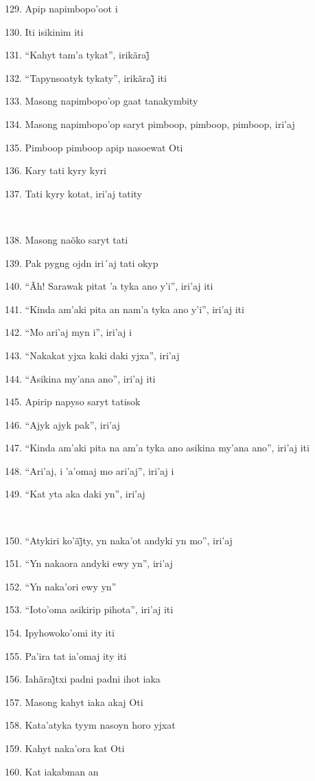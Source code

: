 129. Apip napimbopo'oot i

130. Iti isikinim iti

131. ``Kahyt tam’a tykat'', irikãraj̃

132. ``Tapynsoatyk tykaty'', irikãraj̃ iti

133. Masong napimbopo'op gaat tanakymbity

134. Masong napimbopo'op saryt pimboop, pimboop, pimboop, iri'aj

135. Pimboop pimboop apip nasoewat Oti

136. Kary tati kyry kyri

137. Tati kyry kotat, iri'aj tatity

~

138. Masong naõko saryt tati

139. Pak pygng ojdn iri´aj tati okyp

140. ``Ãh! Sarawak pitat 'a tyka ano y'i'', iri'aj iti

141. ``Kinda am'aki pita an nam'a tyka ano y'i'', iri'aj iti

142. ``Mo ari'aj myn i'', iri'aj i

143. ``Nakakat yjxa kaki daki yjxa'', iri'aj

144. ``Asikina my'ana ano'', iri'aj iti

145. Apirip napyso saryt tatisok

146. ``Ajyk ajyk pak'', iri'aj

147. ``Kinda am'aki pita na am'a tyka ano asikina my'ana ano'', iri'aj iti

148. ``Ari'aj, i 'a'omaj mo ari'aj'', iri'aj i

149. ``Kat yta aka daki yn'', iri'aj

~

150. ``Atykiri ko’ãj̃ty, yn naka’ot andyki yn mo'', iri’aj

151. ``Yn nakaora andyki ewy yn'', iri'aj

152. ``Yn naka'ori ewy yn''

153. ``Ioto'oma asikirip pihota'', iri'aj iti

154. Ipyhowoko'omi ity iti

155. Pa'ira tat ia'omaj ity iti

156. Iahãraj̃txi padni padni ihot iaka

157. Masong kahyt iaka akaj Oti

158. Kata'atyka tyym nasoyn horo yjxat

159. Kahyt naka'ora kat Oti

160. Kat iakabman an

